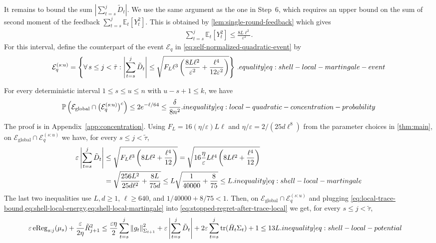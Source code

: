 \documentclass[12pt,cleveref]{jmlr}
\newcommand{\eqlabel}[1]{\label[equality]{#1}}
\newcommand{\ineqlabel}[1]{\label[inequality]{#1}}
\newcommand{\E}{\mathbb E}
\newcommand{\Pp}{\mathbb P}
\newcommand{\tr}{\operatorname{tr}}
\newcommand{\1}{\mathbf 1}
\newcommand{\eps}{\varepsilon}
\newcommand{\normm}[2]{\left\lVert #1\right\rVert_{#2}}
\begin{document}
It remains to bound the sum $\left|\sum_{t=s}^j \tilde{D}_t\right|$.
We use the same argument as the one in Step~6, which requires an upper bound on the sum of second moment of the feedback
$\sum_{t=s}^j \E_t[Y_t^2]$.
This is obtained by \cref{lem:single-round-feedback} which gives
\begin{align}
    \sum_{t=s}^{j}\E_t[Y_t^2]\leq\frac{8L\ell^2}{\eps^2}.
\end{align}
For this interval, define the counterpart of the event $\mathcal E_q$
in \cref{eq:self-normalized-quadratic-event} by
\begin{align}
    \mathcal E_q^{(s:u)} = \left\{ \forall\,s\leq j<\tilde\tau:
        \left|\sum_{t=s}^{j}\tilde D_t\right|
        \leq\sqrt{F_L\ell^3\left(\frac{8L\ell^2}{\eps^2}
        +\frac{\ell^4}{12\eps^2}\right)}
    \right\}\,.
    \eqlabel{eq:shell-local-martingale-event}
\end{align}
\begin{lemma}
    \label{lem:local-quadratic-concentration}
    For every deterministic interval $1\leq s\leq u\leq n$ with
    $u-s+1\leq k$, we have
    \begin{align}
        \Pp\left(\mathcal E_{\mathrm{global}}\cap
        \bigl(\mathcal E_q^{(s:u)}\bigr)^c\right)
        \leq2e^{-\ell/64}\leq\frac{\delta}{8n^2}.
        \ineqlabel{eq:local-quadratic-concentration-probability}
    \end{align}
\end{lemma}
The proof is in Appendix~\ref{app:concentration}.
Using $F_L=16(\eta/\eps)L\ell$ and
$\eta/\eps=2/(25d\ell^8)$ from the parameter choices in \cref{thm:main},
on $\mathcal E_{\mathrm{global}}\cap\mathcal E_q^{(s:u)}$ we have,
for every $s\leq j<\tilde\tau$,
\begin{align}
    \eps\left|\sum_{t=s}^{j}\tilde D_t\right|
    & \leq\sqrt{F_L\ell^3\left(8L\ell^2+\frac{\ell^4}{12}\right)}
    =\sqrt{16\frac{\eta}{\eps}L\ell^4
    \left(8L\ell^2+\frac{\ell^4}{12}\right)}
    \\
    & =\sqrt{\frac{256L^2}{25d\ell^2}+\frac{8L}{75d}}
    \leq L\sqrt{\frac{1}{40000}+\frac{8}{75}}
    \leq L.
    \ineqlabel{eq:shell-local-martingale}
\end{align}
The last two inequalities use $L,d\geq1$, $\ell\geq640$, and
$1/40000+8/75<1$.
Then, on $\mathcal E_{\mathrm{global}}\cap\mathcal E_q^{(s:u)}$ and plugging \cref{eq:local-trace-bound,eq:shell-local-energy,eq:shell-local-martingale} into
\cref{eq:stopped-regret-after-trace-local} we get, for every $s\leq j<\tilde\tau$,
\begin{align}
    \eps\operatorname{eReg}_{s:j}(\mu_s)
    +\frac{\eps}{2\eta}\tilde R_{j+1}^2
    & \leq
    \frac{\eps\eta}{2}\sum_{t=s}^{j}\normm{g_t}{\Sigma_{t+1}}^2
    +\eps\left|\sum_{t=s}^{j}\tilde D_t\right|
    +2\eps\sum_{t=s}^{j}\tr(\bar H_t\Sigma_t)
    +1
    \leq13L.
    \ineqlabel{eq:shell-local-potential}
\end{align}
\end{document}
